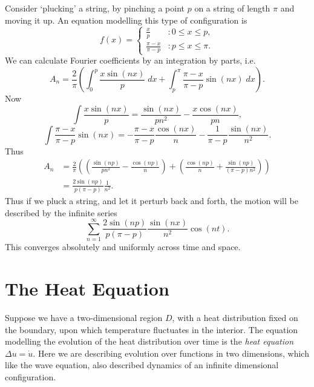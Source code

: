 \begin{example}
    Consider `plucking' a string, by pinching a point $p$ on a string of length $\pi$ and moving it up. An equation modelling this type of configuration is
    \[ f(x) = \begin{cases} \frac{x}{p} & : 0 \leq x \leq p, \\ \frac{\pi - x}{\pi - p} & : p \leq x \leq \pi. \end{cases} \]
    We can calculate Fourier coefficients by an integration by parts, i.e.
    \[ A_n = \frac{2}{\pi} \left( \int_0^p \frac{x \sin(nx)}{p}\; dx + \int_p^\pi \frac{\pi - x}{\pi - p} \sin(nx)\; dx \right). \]
    Now
    \[ \int \frac{x \sin(nx)}{p} = \frac{\sin(nx)}{p n^2} - \frac{x \cos(nx)}{pn}, \]
    \[ \int \frac{\pi - x}{\pi - p} \sin(nx) = - \frac{\pi - x}{\pi - p} \frac{\cos(nx)}{n} - \frac{1}{\pi - p} \frac{\sin(nx)}{n^2}. \]
    Thus
    \begin{align*}
    	A_n &= \frac{2}{\pi} \left( \left( \frac{\sin(np)}{p n^2} - \frac{\cos(np)}{n} \right) + \left( \frac{\cos(np)}{n} + \frac{\sin(np)}{(\pi - p) n^2} \right) \right)\\
        &= \frac{2 \sin(np)}{p(\pi - p)} \frac{1}{n^2}.
    \end{align*}
    Thus if we pluck a string, and let it perturb back and forth, the motion will be described by the infinite series
    \[ \sum_{n = 1}^\infty \frac{2 \sin(np)}{p (\pi - p)} \frac{\sin(nx)}{n^2} \cos(nt). \]
    This converges absolutely and uniformly across time and space.
\end{example}

\section{The Heat Equation}

Suppose we have a two-dimensional region $D$, with a heat distribution fixed on the boundary, upon which temperature fluctuates in the interior. The equation modelling the evolution of the heat distribution over time is the \emph{heat equation} $\Delta u = \dot{u}$. Here we are describing evolution over functions in two dimensions, which like the wave equation, also described dynamics of an infinite dimensional configuration.

